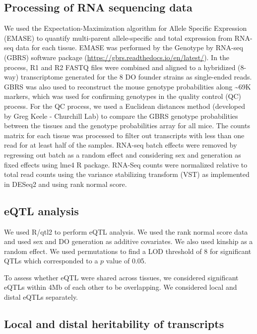 \documentclass[
]{article}
\begin{document}
\subsection{Processing of RNA sequencing
data}\label{processing-of-rna-sequencing-data}

We used the Expectation-Maximization algorithm for Allele Specific
Expression (EMASE) \cite{pmid29444201, pmid25236449} to quantify
multi-parent allele-specific and total expression from RNA-seq data for
each tissue. EMASE was performed by the Genotype by RNA-seq (GBRS)
software package (\url{https://gbrs.readthedocs.io/en/latest/}). In the
process, R1 and R2 FASTQ files were combined and aligned to a hybridized
(8-way) transcriptome generated for the 8 DO founder strains as
single-ended reads. GBRS was also used to reconstruct the mouse genotype
probabilities along \textasciitilde69K markers, which was used for
confirming genotypes in the quality control (QC) process. For the QC
process, we used a Euclidean distances method (developed by Greg Keele -
Churchill Lab) to compare the GBRS genotype probabilities between the
tissues and the genotype probabilities array for all mice. The counts
matrix for each tissue was processed to filter out transcripts with less
than one read for at least half of the samples. RNA-seq batch effects
were removed by regressing out batch as a random effect and considering
sex and generation as fixed effects using lme4 R package. RNA-Seq counts
were normalized relative to total read counts using the variance
stabilizing transform (VST) as implemented in DESeq2 and using rank
normal score.

\subsection{eQTL analysis}\label{eqtl-analysis}

We used R/qtl2 \cite{pmid30591514} to perform eQTL analysis. We used the
rank normal score data and used sex and DO generation as additive
covariates. We also used kinship as a random effect. We used
permutations to find a LOD threshold of 8 for significant QTLs which
corresponded to a \(p\) value of 0.05.

To assess whether eQTL were shared across tissues, we considered
significant eQTLs within 4Mb of each other to be overlapping. We
considered local and distal eQTLs separately.

\subsection{Local and distal heritability of
transcripts}\label{local-and-distal-heritability-of-transcripts}
\end{document}
